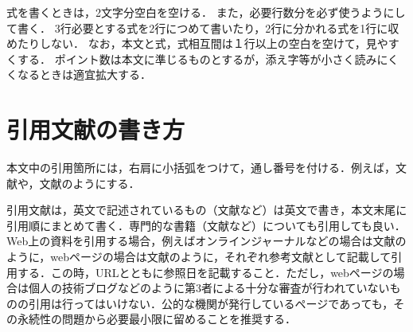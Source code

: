 \documentclass[10pt]{ujarticle}
\begin{document}
    
    式を書くときは，2文字分空白を空ける．
    また，必要行数分を必ず使うようにして書く．
    3行必要とする式を2行につめて書いたり，2行に分かれる式を1行に収めたりしない．
    なお，本文と式，式相互間は１行以上の空白を空けて，見やすくする．
    ポイント数は本文に準じるものとするが，添え字等が小さく読みにくくなるときは適宜拡大する．
    
    
    \section{引用文献の書き方}%
    本文中の引用箇所には，右肩に小括弧をつけて，通し番号を付ける．例えば，文献\cite{工大2005}や，文献\cite{Shibutani2004, Handbook1979, Kikuchi2017, Adrobo2019}のようにする．
    
    引用文献は，英文で記述されているもの（文献\cite{Shibutani2004}など）は英文で書き，本文末尾に引用順にまとめて書く．専門的な書籍（文献\cite{Handbook1979}など）についても引用しても良い．
    Web上の資料を引用する場合，例えばオンラインジャーナルなどの場合は文献\cite{Kikuchi2017}のように，webページの場合は文献\cite{Adrobo2019}のように，それぞれ参考文献として記載して引用する．この時，URLとともに参照日を記載すること．ただし，webページの場合は個人の技術ブログなどのように第3者による十分な審査が行われていないものの引用は行ってはいけない．公的な機関が発行しているページであっても，その永続性の問題から必要最小限に留めることを推奨する．
        
\end{document}
